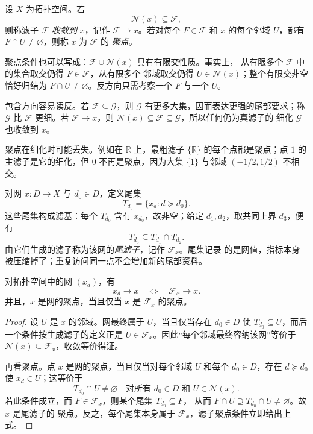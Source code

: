 \begin{definition}[滤子的收敛与聚集]
设 \(X\) 为拓扑空间。若
\[
 \mathcal N(x)\subseteq\mathcal F,
\]
则称滤子 \(\mathcal F\) \emph{收敛到} \(x\)，记作
\(\mathcal F\to x\)。若对每个 \(F\in\mathcal F\) 和 \(x\) 的每个邻域
\(U\)，都有 \(F\cap U\neq\varnothing\)，则称 \(x\) 为 \(\mathcal F\) 的
\emph{聚点}。
\end{definition}

聚点条件也可以写成：\(\mathcal F\cup\mathcal N(x)\) 具有有限交性质。事实上，
从有限多个 \(\mathcal F\) 中的集合取交仍得 \(F\in\mathcal F\)，从有限多个
邻域取交仍得 \(U\in\mathcal N(x)\)；整个有限交非空恰好归结为
\(F\cap U\neq\varnothing\)。反方向只需考察一个 \(F\) 与一个 \(U\)。

\begin{remark}[细化方向]
包含方向容易读反。若 \(\mathcal F\subseteq\mathcal G\)，则
\(\mathcal G\) 有更多大集，因而表达更强的尾部要求；称 \(\mathcal G\) 比
\(\mathcal F\) 更细。若 \(\mathcal F\to x\)，则
\(\mathcal N(x)\subseteq\mathcal F\subseteq\mathcal G\)，所以任何仍为真滤子的
细化 \(\mathcal G\) 也收敛到 \(x\)。

聚点在细化时可能丢失。例如在 \(\mathbb R\) 上，最粗滤子
\(\{\mathbb R\}\) 的每个点都是聚点；点 \(1\) 的主滤子是它的细化，但 \(0\)
不再是聚点，因为大集 \(\{1\}\) 与邻域 \((-1/2,1/2)\) 不相交。
\end{remark}

\begin{definition}[网的尾滤子]
对网 \(x\colon D\to X\) 与 \(d_0\in D\)，定义尾集
\[
 T_{d_0}=\{x_d:d\succeq d_0\}.
\]
这些尾集构成滤基：每个 \(T_{d_0}\) 含有 \(x_{d_0}\)，故非空；给定
\(d_1,d_2\)，取共同上界 \(d_3\)，便有
\[
 T_{d_3}\subseteq T_{d_1}\cap T_{d_2}.
\]
由它们生成的滤子称为该网的\emph{尾滤子}，记作 \(\mathcal F_x\)。尾集记录
的是网值，指标本身被压缩掉了；重复访问同一点不会增加新的尾部资料。
\end{definition}

\begin{proposition}[网与尾滤子有相同极限]
对拓扑空间中的网 \((x_d)\)，有
\[
 x_d\to x\quad\Longleftrightarrow\quad\mathcal F_x\to x.
\]
并且，\(x\) 是网的聚点，当且仅当 \(x\) 是 \(\mathcal F_x\) 的聚点。
\label{ch1:prop:net-tail-filter}
\end{proposition}

\begin{proof}
设 \(U\) 是 \(x\) 的邻域。网最终属于 \(U\)，当且仅当存在 \(d_0\in D\)
使 \(T_{d_0}\subseteq U\)，而后一个条件按生成滤子的定义正是
\(U\in\mathcal F_x\)。因此“每个邻域最终容纳该网”等价于
\(\mathcal N(x)\subseteq\mathcal F_x\)，收敛等价得证。

再看聚点。点 \(x\) 是网的聚点，当且仅当对每个邻域 \(U\) 和每个
\(d_0\in D\)，存在 \(d\succeq d_0\) 使 \(x_d\in U\)；这等价于
\[
 T_{d_0}\cap U\neq\varnothing
 \quad\text{对所有 }d_0\in D\text{ 和 }U\in\mathcal N(x).
\]
若此条件成立，而 \(F\in\mathcal F_x\)，则某个尾集 \(T_{d_0}\subseteq F\)，
从而 \(F\cap U\supseteq T_{d_0}\cap U\neq\varnothing\)。故 \(x\) 是尾滤子的
聚点。反之，每个尾集本身属于 \(\mathcal F_x\)，滤子聚点条件立即给出上式。
\end{proof}

